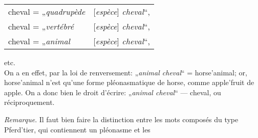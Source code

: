 {    \begin{tabular}[b]{ll}
\textup{cheval} =	„\emph{quadrupède}&[\emph{espèce}]	\emph{cheval}“,\\
\textup{cheval} =	„\emph{vertébré}&[\emph{espèce}]	\emph{cheval}“,\\
\textup{cheval} =	„\emph{animal}&[\emph{espèce}]	\emph{cheval}“,
    \end{tabular} etc.\\

    On a en effet, par la loi de renversement: „\emph{animal cheval}“
    = \textup{horse'animal}; or, \textup{horse'animal} n’est qu’une
    forme pléonasmatique de \textup{horse}, comme \textup{apple'fruit}
    de \textup{apple}. On a donc bien le droit d’écrire:
    „\emph{animal cheval}“ — \textup{cheval}, ou réciproquement.

    \emph{Remarque}. Il faut bien faire la distinction entre les mots
    composés du type \textup{Pferd'tier}, qui contiennent un pléonasme
    et les

  }

